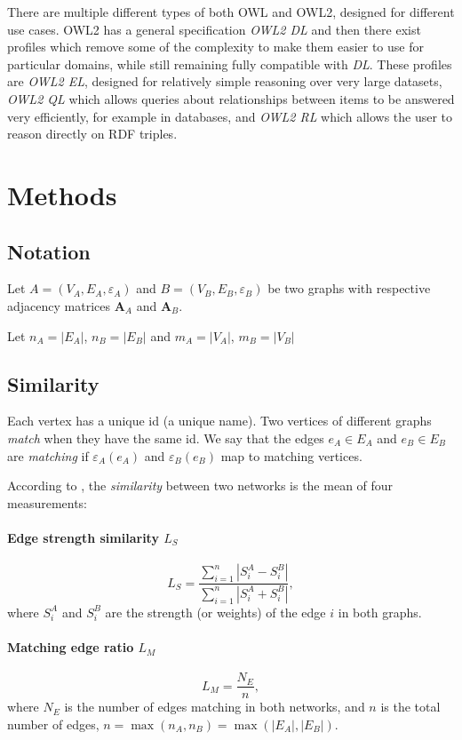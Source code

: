 \documentclass[english, 12pt]{article}
\begin{document}
There are multiple different types of both OWL and OWL2, designed for different use cases. OWL2 has a general specification \emph{OWL2 DL}\cite{w3c_owl2} and then there exist profiles which remove some of the complexity to make them easier to use for particular domains, while still remaining fully compatible with \emph{DL}. These profiles are \emph{OWL2 EL}, designed for relatively simple reasoning over very large datasets, \emph{OWL2 QL} which allows queries about relationships between items to be answered very efficiently, for example in databases, and \emph{OWL2 RL} which allows the user to reason directly on RDF triples.

\section{Methods}

\subsection*{Notation}

Let $A = (V_A,E_A, \varepsilon_A)$ and $B = (V_B,E_B, \varepsilon_B)$ be two graphs with respective adjacency matrices $\mathbf A_A$ and $\mathbf A_B$.

Let $n_A = |E_A|$, $n_B = |E_B|$ and $m_A = |V_A|$, $m_B = |V_B|$

\subsection{Similarity}
Each vertex has a unique id (a unique name). Two vertices of different graphs {\it match} when they have the same id.
We say that the edges $e_A \in E_A$ and $e_B \in E_B$ are {\it matching} if $\varepsilon_A(e_A)$ and $\varepsilon_B(e_B)$ map to matching vertices.

According to \cite{2019osti}, the {\it similarity} between two networks is the mean of four measurements:
\paragraph{Edge strength similarity $L_S$}
\[L_S = \frac{\sum_{i = 1}^n|S_i^A - S_i^B|}{\sum_{i=1}^n|S_i^A + S_i^B|},\]
where $S_i^A$ and $S_i^B$ are the strength (or weights) of the edge $i$ in both graphs.

\paragraph{Matching edge ratio $L_M$}
\[L_M = \frac{N_E}{n},\]
where $N_E$ is the number of edges matching in both networks, and $n$ is the total number of edges, $n = \max(n_A,n_B) = \max(|E_A|, |E_B|)$.
\end{document}
